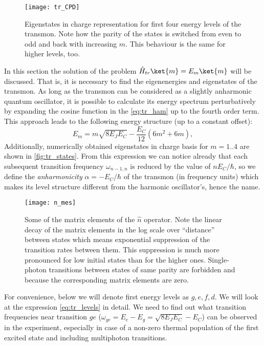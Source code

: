 \begin{figure}
\centering
\texttt{[image: tr\_CPD]}
\caption{Eigenstates in charge representation for first four energy levels of the transmon. Note how the parity of the states is switched from even to odd and back with increasing $m$. This behaviour is the same for higher levels, too.}
\label{fig:tr_states}
\end{figure}

In this section the solution of the problem $\hat H_{tr} \ket{m} = E_m \ket{m}$ will be discussed. That is, it is necessary to find the eigenenergies and eigenstates of the transmon. As long as the transmon can be considered as a slightly anharmonic quantum oscillator, it is possible to calculate its energy spectrum perturbatively by expanding the cosine function in the \eqref{eq:tr_ham} up to the fourth order term. This approach leads\cite{Koch2007} to the following energy structure (up to a constant offset):
\begin{equation}
E_m = m \sqrt{8E_J E_C} -\frac{E_C}{12}(6m^2+6m),
\label{eq:tr_levels}
\end{equation}
Additionally, numerically obtained eigenstates in charge basis for $m=1..4$ are shown in \autoref{fig:tr_states}. From this expression we can notice already that each subsequent transition frequency $\omega_{n-1,n}$ is reduced by the value of $n E_C/\hbar$, so we define the \textit{anharmonicity} $\alpha = -E_C/\hbar$ of the transmon (in frequency units) which makes its level structure different from the harmonic oscillator's, hence the name.

\begin{figure}
\centering
\texttt{[image: n\_mes]}
\caption{Some of the matrix elements of the $\hat n$ operator. Note the linear decay of the matrix elements in the log scale over ``distance'' between states which means exponential suppression of the transition rates between them. This suppression is much more pronounced for low initial states than for the higher ones. Single-photon transitions between states of same parity are forbidden and because the corresponding matrix elements are zero.}
\label{fig:n_mes}
\end{figure}


For convenience, below we will denote first energy levels as $g,e,f,d$. We will look at the expression \eqref{eq:tr_levels} in detail. We need to find out what transition frequencies near transition $ge$ ($\omega_{ge} = E_e - E_g = \sqrt{8E_J E_C} - E_C$) can be observed in the experiment, especially in case of a non-zero thermal population of the first excited state and including multiphoton transitions. 

